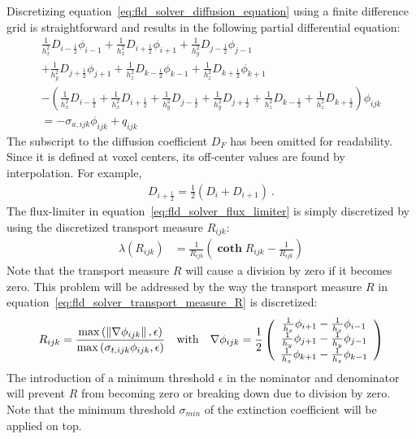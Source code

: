 Discretizing equation~\ref{eq:fld_solver_diffusion_equation} using a finite difference grid is straightforward and results in the following partial differential equation:
\begin{align}
\frac{1}{h_x^2}D_{i-\frac{1}{2}}\phi_{i-1}
+\frac{1}{h_x^2}D_{i+\frac{1}{2}}\phi_{i+1}
+\frac{1}{h_y^2}D_{j-\frac{1}{2}}\phi_{j-1}
\\
+\frac{1}{h_y^2}D_{j+\frac{1}{2}}\phi_{j+1}
+\frac{1}{h_z^2}D_{k-\frac{1}{2}}\phi_{k-1}
+\frac{1}{h_z^2}D_{k+\frac{1}{2}}\phi_{k+1}
\\
-\left(
\frac{1}{h_x^2}D_{i-\frac{1}{2}}+\frac{1}{h_x^2}D_{i+\frac{1}{2}}
+\frac{1}{h_y^2}D_{j-\frac{1}{2}}+\frac{1}{h_y^2}D_{j+\frac{1}{2}}
+\frac{1}{h_z^2}D_{k-\frac{1}{2}}+\frac{1}{h_z^2}D_{k+\frac{1}{2}}
\right)
\phi_{ijk}
\\
= -\sigma_{a, ijk}\phi_{ijk} + q_{ijk}
\label{eq:fld_solver_discretized_diffusion_equation}
\end{align}
The subscript to the diffusion coefficient $D_F$ has been omitted for readability. Since it is defined at voxel centers, its off-center values are found by interpolation. For example,
\begin{align}
D_{i+\frac{1}{2}} = \frac{1}{2}\left( D_{i}+D_{i+1}\right)\ .
\label{eq:fld_solver_D_interpolated}
\end{align}
The flux-limiter in equation~\ref{eq:fld_solver_flux_limiter} is simply discretized by using the discretized transport measure $R_{ijk}$:
\begin{align}
\lambda(R_{ijk}) &= \frac{1}{R_{ijk}}\left(\mathbf{\operatorname{coth}}R_{ijk} - \frac{1}{R_{ijk}}\right)
\label{eq:fld_solver_discrete_flux_limiter}
\end{align}
Note that the transport measure $R$ will cause a division by zero if it becomes zero. This problem will be addressed by the way the transport measure $R$ in equation~\ref{eq:fld_solver_transport_measure_R} is discretized:
\begin{align}
R_{ijk} = \frac{\operatorname{max}\left(\left\lVert\nabla\phi_{ijk}\right\rVert,\epsilon\right)}{\operatorname{max}\left(\sigma_{t,ijk}\phi_{ijk},\epsilon\right)}
\quad
\text{with}
\quad
\nabla\phi_{ijk} = \frac{1}{2}
\left(
\begin{array}{c}
\frac{1}{h_x}\phi_{i+1}-\frac{1}{h_x}\phi_{i-1} \\
\frac{1}{h_y}\phi_{j+1}-\frac{1}{h_y}\phi_{j-1} \\
\frac{1}{h_z}\phi_{k+1}-\frac{1}{h_z}\phi_{k-1} \\
\end{array}
\right)
\label{eq:fld_solver_discrete_R}
\end{align}
The introduction of a minimum threshold $\epsilon$ in the nominator and denominator will prevent $R$ from becoming zero or breaking down due to division by zero. Note that the minimum threshold $\sigma_{min}$ of the extinction coefficient will be applied on top.


